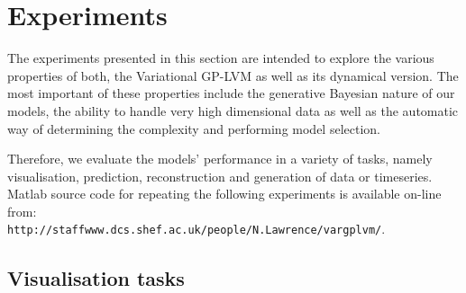 \documentclass [10pt , a4paper]{article}
\begin{document}






\section{\label{section:experiments} Experiments}

The experiments presented in this section are intended to explore the various properties of both, the Variational
GP-LVM as well as its dynamical version. The most important of these properties include the generative Bayesian
nature of our models, the ability to handle very high dimensional data as well as the automatic way of determining
the complexity and performing model selection.

Therefore, we evaluate the models' performance in a variety of tasks, namely
visualisation, prediction, reconstruction and generation of data or timeseries.
Matlab source code for repeating the following experiments is available
on-line from: \\
\verb|http://staffwww.dcs.shef.ac.uk/people/N.Lawrence/vargplvm/|.

\subsection{Visualisation tasks}
\end{document}

